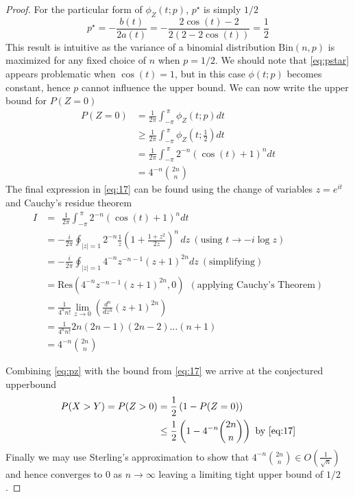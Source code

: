 \begin{proof}
    For the particular form of $\phi_Z(t; p)$, $p^\star$ is simply $1/2$
    \begin{equation}
        p^\star = -\frac{b(t)}{2 a(t)} = -\frac{2 \cos (t)-2}{2 (2-2 \cos (t))} = \frac{1}{2}
        \label{eq:pstar}
    \end{equation}
    This result is intuitive as the variance of a binomial distribution $\text{Bin}(n,p)$ is maximized for any fixed choice of $n$ when $p=1/2$.
    We should note that \autoref{eq:pstar} appears problematic when $\cos(t)=1$, but in this case $\phi(t;p)$ becomes constant, hence $p$ cannot influence the upper bound.
    We can now write the upper bound for $P(Z=0)$
    \begin{align}
        P(Z=0) &= \frac{1}{2\pi}\int_{-\pi}^{\ \pi} \phi_{Z}(t;p) dt\\
        &\geq \frac{1}{2\pi}\int_{-\pi}^{\ \pi} \phi_Z\left(t;\frac{1}{2}\right) dt\\
        &=  \frac{1}{2\pi}\int_{-\pi}^{\ \pi} 2^{-n} (\cos (t)+1)^n dt \\
        &= 4^{-n}\binom{2n}{n} \label{eq:17}
    \end{align}
    The final expression in \cref{eq:17} can be found using the change of variables $z = e^{i t}$ and Cauchy's residue theorem~\citep{complex}
    \begin{align}
        I &= \ \ \frac{1}{2\pi}\int_{-\pi}^{\ \pi} 2^{-n} (\cos (t)+1)^n dt\\
        & = -\frac{i}{2 \pi } \oint_{|z|=1} 2^{-n} \frac{1}{z}\left(1+\frac{1+z^2}{2 z}\right)^n \, dz\ (\text{using } t\to -i \log z)\\
        &=  -\frac{i}{2 \pi } \oint_{|z|=1} 4^{-n} z^{-n-1} (z+1)^{2 n} dz\ (\text{simplifying}) \\
        & = \text{Res}\left( 4^{-n} z^{-n-1} (z+1)^{2 n}, 0\right)\ \ (\text{applying Cauchy's Theorem})\\
        & = \frac{1}{4^n n!} \lim_{z\to 0}\left( \frac{d^n}{d z^n} (z+1)^{2 n}\right)\\
        & = \frac{1}{4^n n!} 2n (2n -1) (2n-2)\ldots (n + 1)\\
        & = 4^{-n} \binom{2n}{n}
    \end{align}

    Combining \cref{eq:pz} with the bound from \cref{eq:17} we arrive at the conjectured upperbound
    \begin{align}
        P(X > Y) = P(Z>0) &= \frac{1}{2}\left(1 - P(Z=0)\right)\\
        &\leq \frac{1}{2}\left(1-4^{-n} \binom{2n}{n} \right) \text{ by \cref{eq:17}}\\
    \end{align}
    Finally we may use Sterling's approximation to show that $4^{-n} \binom{2n}{n} \in O\left(\frac{1}{\sqrt{n}}\right)$ and hence converges to $0$ as $n\to \infty$ leaving a limiting tight upper bound of $1/2$.
\end{proof}

